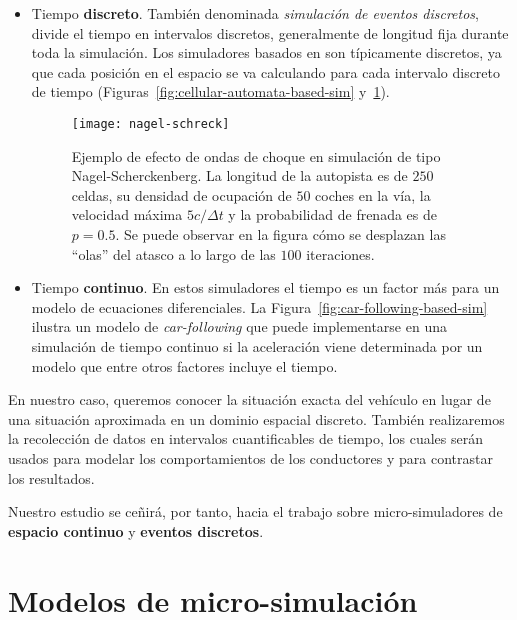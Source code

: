 \begin{itemize}
	\item Tiempo \textbf{discreto}. También denominada \textit{simulación de eventos discretos}, divide el tiempo en intervalos discretos, generalmente de longitud fija durante toda la simulación. Los simuladores basados en  son típicamente discretos, ya que cada posición en el espacio se va calculando para cada intervalo discreto de tiempo (Figuras~\ref{fig:cellular-automata-based-sim} y~\ref{fig:nagel-schreck}).
	
	\begin{figure}
		\centering
		\texttt{[image: nagel-schreck]}
		\caption[Ejemplo de efecto de ondas de choque en simulación de tipo Nagel-Scherckenberg]{Ejemplo de efecto de ondas de choque en simulación de tipo Nagel-Scherckenberg. La longitud de la autopista es de $250$ celdas, su densidad de ocupación de $50$ coches en la vía, la velocidad máxima $5 c/\Delta t$ y la probabilidad de frenada es de $p = 0.5$. Se puede observar en la figura cómo se desplazan las \enquote{olas} del atasco a lo largo de las $100$ iteraciones.}
		\label{fig:nagel-schreck}
	\end{figure}
	
	\item Tiempo \textbf{continuo}. En estos simuladores el tiempo es un factor más para un modelo de ecuaciones diferenciales. La Figura~\ref{fig:car-following-based-sim} ilustra un modelo de \textit{\gls{car-following}} que puede implementarse en una simulación de tiempo continuo si la aceleración viene determinada por un modelo que entre otros factores incluye el tiempo.
\end{itemize}

En nuestro caso, queremos conocer la situación exacta del vehículo en lugar de una situación aproximada en un dominio espacial discreto. También realizaremos la recolección de datos en intervalos cuantificables de tiempo, los cuales serán usados para modelar los comportamientos de los conductores y para contrastar los resultados.

Nuestro estudio se ceñirá, por tanto, hacia el trabajo sobre micro-simuladores de \textbf{espacio continuo} y \textbf{eventos discretos}.

\section{Modelos de micro-simulación}

